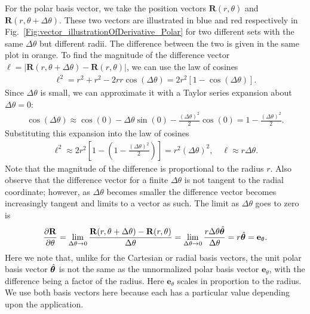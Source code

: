 For the polar basis vector, we take the position vectors $\mathbf{R}(r, \theta)$ and $\mathbf{R}(r, \theta + \Delta \theta)$. These two vectors are illustrated in blue and red respectively in Fig.~\ref{Fig:vector_illustrationOfDerivative_Polar} for two different sets with the same $\Delta \theta$ but different radii. The difference between the two is given in the same plot in orange. To find the magnitude of the difference vector $\ell = | \mathbf{R}(r, \theta + \Delta \theta) - \mathbf{R}(r, \theta) |$, we can use the law of cosines
\begin{align}
  \ell^2 = r^2 + r^2 - 2rr\cos( \Delta \theta ) = 2r^2 [ 1 - \cos( \Delta \theta ) ].
\end{align}
Since $\Delta \theta$ is small, we can approximate it with a Taylor series expansion about $\Delta \theta = 0$:
\begin{align}
  \cos( \Delta \theta ) \approx \cos(0) - \Delta \theta \sin(0) - \frac{ ( \Delta \theta )^2 }{2} \cos(0)
  = 1 - \frac{ ( \Delta \theta )^2 }{2} .
\end{align}
Substituting this expansion into the law of cosines
\begin{align}
  \ell^2 \approx 2r^2 [ 1 - ( 1 - \frac{ ( \Delta \theta )^2 }{2} ) ] = r^2 ( \Delta \theta )^2, \quad \ell \approx r \Delta \theta .
\end{align}
Note that the magnitude of the difference is proportional to the radius $r$. Also observe that the difference vector for a finite $\Delta \theta$ is not tangent to the radial coordinate; however, as $\Delta \theta$ becomes smaller the difference vector becomes increasingly tangent and limits to a vector as such. The limit as $\Delta \theta$ goes to zero is
\begin{align}
   \frac{ \partial {\mathbf{R}} }{ \partial {\theta} } = \lim_{\Delta \theta \rightarrow 0} \frac{ \mathbf{R}(r, \theta + \Delta \theta ) - \mathbf{R}(r,\theta) }{ \Delta \theta } 
   =  \lim_{\Delta \theta \rightarrow 0} \frac{ r \Delta\theta \hat{\boldsymbol\theta}}{\Delta\theta} 
   = r \hat{\boldsymbol\theta} = \mathbf{e}_\theta .
\end{align}
Here we note that, unlike for the Cartesian or radial basis vectors, the unit polar basis vector $\hat{\boldsymbol\theta}$ is not the same as the unnormalized polar basis vector $\mathbf{e}_\theta$, with the difference being a factor of the radius. Here $\mathbf{e}_\theta$ scales in proportion to the radius. We use both basis vectors here because each has a particular value depending upon the application.

